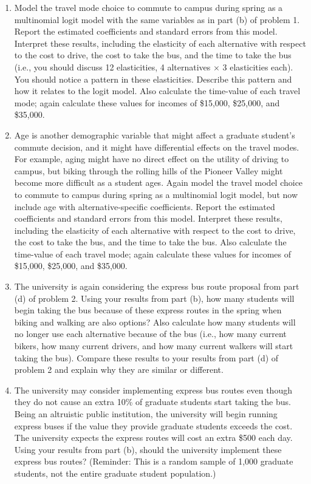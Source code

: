 \documentclass[11pt,letterpaper]{article}
\begin{document}
\begin{enumerate}[label=\alph*., leftmargin=*]
	\item Model the travel mode choice to commute to campus during spring as a multinomial logit model with the same variables as in part (b) of problem 1. Report the estimated coefficients and standard errors from this model. Interpret these results, including the elasticity of each alternative with respect to the cost to drive, the cost to take the bus, and the time to take the bus (i.e., you should discuss 12 elasticities, 4 alternatives $\times$ 3 elasticities each). You should notice a pattern in these elasticities. Describe this pattern and how it relates to the logit model. Also calculate the time-value of each travel mode; again calculate these values for incomes of \$15,000, \$25,000, and \$35,000.

	\item Age is another demographic variable that might affect a graduate student's commute decision, and it might have differential effects on the travel modes. For example, aging might have no direct effect on the utility of driving to campus, but biking through the rolling hills of the Pioneer Valley might become more difficult as a student ages. Again model the travel model choice to commute to campus during spring as a multinomial logit model, but now include age with alternative-specific coefficients. Report the estimated coefficients and standard errors from this model. Interpret these results, including the elasticity of each alternative with respect to the cost to drive, the cost to take the bus, and the time to take the bus. Also calculate the time-value of each travel mode; again calculate these values for incomes of \$15,000, \$25,000, and \$35,000.

	\item The university is again considering the express bus route proposal from part (d) of problem 2. Using your results from part (b), how many students will begin taking the bus because of these express routes in the spring when biking and walking are also options? Also calculate how many students will no longer use each alternative because of the bus (i.e., how many current bikers, how many current drivers, and how many current walkers will start taking the bus). Compare these results to your results from part (d) of problem 2 and explain why they are similar or different.

	\item The university may consider implementing express bus routes even though they do not cause an extra 10\% of graduate students start taking the bus. Being an altruistic public institution, the university will begin running express buses if the value they provide graduate students exceeds the cost. The university expects the express routes will cost an extra \$500 each day. Using your results from part (b), should the university implement these express bus routes? (Reminder: This is a random sample of 1,000 graduate students, not the entire graduate student population.)
\end{enumerate}
\end{document}
